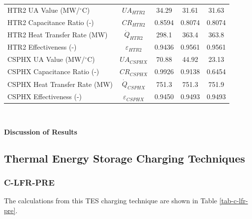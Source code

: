 \begin{paracol}{2}
\begin{specialtable}[H]
\begin{tabular}{lcccc}
    HTR2 UA Value (MW/$^{\circ}$C)	&	$UA_{HTR2}$	&	34.29	&	31.61	&	31.63	\\
    HTR2 Capacitance Ratio (-)	&	$CR_{HTR2}$	&	0.8594	&	0.8074	&	0.8074	\\
    HTR2 Heat Transfer Rate (MW)	&	$\dot{Q}_{HTR2}$	&	298.1	&	363.4	&	363.8	\\
    HTR2 Effectiveness (-)	&	$\varepsilon_{HTR2}$	&	0.9436	&	0.9561	&	0.9561	\\
    CSPHX UA Value (MW/$^{\circ}$C)	&	$UA_{CSPHX}$	&	70.88	&	44.92	&	23.13	\\
    CSPHX Capacitance Ratio (-)	&	$CR_{CSPHX}$	&	0.9926	&	0.9138	&	0.6454	\\
    CSPHX Heat Transfer Rate (MW)	&	$\dot{Q}_{CSPHX}$	&	751.3	&	751.3	&	751.9	\\
    CSPHX Effectiveness (-)	&	$\varepsilon_{CSPHX}$	&	0.9450	&	0.9493	&	0.9493	\\
    \bottomrule
    \end{tabular}\\
\end{specialtable}

\textbf{Discussion of Results}


\subsection{Thermal Energy Storage Charging Techniques}


\subsubsection{C-LFR-PRE}

The calculations from this TES charging technique are shown in Table \ref{tab-c-lfr-pre}.


\end{paracol}
